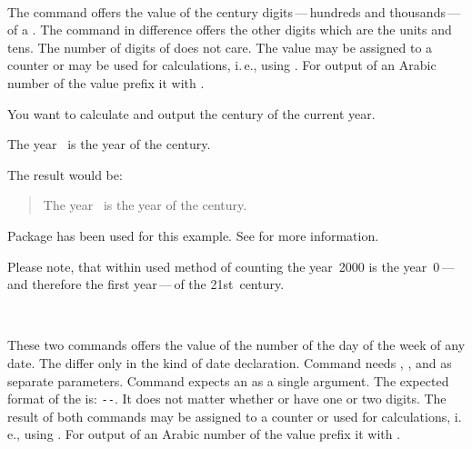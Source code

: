 \begin{Declaration}
  \\%
\end{Declaration}%
The command  offers
the value of the century digits\,---\,hundreds and thousands\,---\,of a
. The command  in difference offers the other
digits which are the units and tens. The number of digits of  does
not care. The value may be assigned to a counter or may be used for
calculations, i.\,e., using . For
output of an Arabic number of the value prefix it with
.

\begin{Example}
  You want to calculate and output the century of the current year.
\begin{lstcode}
  The year \the\year\ is the year \the\DecadePart{\year}
  of the \engord{\numexpr\CenturyPart{\year}+1\relax} century.
\end{lstcode}
  The result would be:
  \begin{quote}
    The year \the\year\ is the year \the\DecadePart{\year}
    of the \engordnumber{\numexpr\CenturyPart{\year}+1\relax} century.
  \end{quote}
  Package  has been used for this
  example. See \cite{package:engord} for more information.
\end{Example}

Please note, that within used method of counting the
year~2000 is the year~0\,---\,and therefore the first year\,---\,of the
21st~century.%
\EndIndexGroup


\begin{Declaration}
  \\%
\end{Declaration}%
These two commands offers the value of
the number of the day of the week of any date. The
differ only in the kind of date declaration. Command  needs
, , and  as separate parameters. Command
 expects an  as a single argument. The
expected format of the  is:
\texttt{-}\texttt{-}. It does not matter
whether  or  have one or two digits. The result of
both commands may be assigned to a counter or used for calculations, i.\,e.,
using . For output of an
Arabic number of the value prefix it with .

